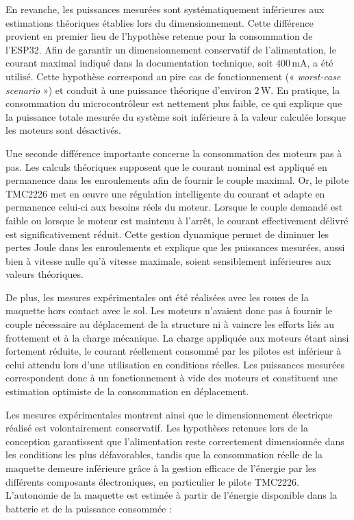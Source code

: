 En revanche, les puissances mesurées sont systématiquement inférieures aux estimations théoriques établies lors du dimensionnement. Cette différence provient en premier lieu de l'hypothèse retenue pour la consommation de l'ESP32. Afin de garantir un dimensionnement conservatif de l'alimentation, le courant maximal indiqué dans la documentation technique, soit $400\,\si{\milli\ampere}$, a été utilisé. Cette hypothèse correspond au pire cas de fonctionnement (« \textit{worst-case scenario} ») et conduit à une puissance théorique d'environ $2\,\si{\watt}$. En pratique, la consommation du microcontrôleur est nettement plus faible, ce qui explique que la puissance totale mesurée du système soit inférieure à la valeur calculée lorsque les moteurs sont désactivés.

Une seconde différence importante concerne la consommation des moteurs pas à pas. Les calculs théoriques supposent que le courant nominal est appliqué en permanence dans les enroulements afin de fournir le couple maximal. Or, le pilote TMC2226 met en œuvre une régulation intelligente du courant et adapte en permanence celui-ci aux besoins réels du moteur. Lorsque le couple demandé est faible ou lorsque le moteur est maintenu à l'arrêt, le courant effectivement délivré est significativement réduit. Cette gestion dynamique permet de diminuer les pertes Joule dans les enroulements et explique que les puissances mesurées, aussi bien à vitesse nulle qu'à vitesse maximale, soient sensiblement inférieures aux valeurs théoriques.

De plus, les mesures expérimentales ont été réalisées avec les roues de la maquette hors contact avec le sol. Les moteurs n'avaient donc pas à fournir le couple nécessaire au déplacement de la structure ni à vaincre les efforts liés au frottement et à la charge mécanique. La charge appliquée aux moteurs étant ainsi fortement réduite, le courant réellement consommé par les pilotes est inférieur à celui attendu lors d'une utilisation en conditions réelles. Les puissances mesurées correspondent donc à un fonctionnement à vide des moteurs et constituent une estimation optimiste de la consommation en déplacement.

Les mesures expérimentales montrent ainsi que le dimensionnement électrique réalisé est volontairement conservatif. Les hypothèses retenues lors de la conception garantissent que l'alimentation reste correctement dimensionnée dans les conditions les plus défavorables, tandis que la consommation réelle de la maquette demeure inférieure grâce à la gestion efficace de l'énergie par les différents composants électroniques, en particulier le pilote TMC2226.
L'autonomie de la maquette est estimée à partir de l'énergie disponible dans la batterie et de la puissance consommée :

